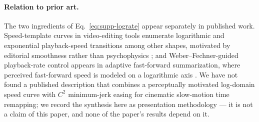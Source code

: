 \paragraph{Relation to prior art.}
The two ingredients of Eq.~\eqref{eq:supp-lograte} appear separately in
published work. Speed-template curves in video-editing tools enumerate
logarithmic and exponential playback-speed transitions among other
shapes, motivated by editorial smoothness rather than psychophysics
\citep{gopro2017variable,adobe2012changing}; and Weber--Fechner-guided
playback-rate control appears in adaptive fast-forward summarization,
where perceived fast-forward speed is modeled on a logarithmic axis
\citep{jin2017elasticplay}. We have not found a published description
that combines a perceptually motivated log-domain speed curve with
$C^2$ minimum-jerk easing for cinematic slow-motion time remapping; we
record the synthesis here as presentation methodology --- it is not a
claim of this paper, and none of the paper's results depend on it.
